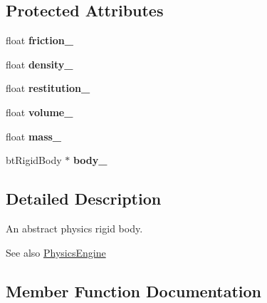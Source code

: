 \subsection*{Protected Attributes}
\begin{DoxyCompactItemize}
\item 
\mbox{\label{classTarbora_1_1RigidBody_a2ce3f561d2aeaab0e2efc613675c670f}} 
float {\bfseries friction\+\_\+}
\item 
\mbox{\label{classTarbora_1_1RigidBody_a9835a8aa577d42210e3eef8c54733d3e}} 
float {\bfseries density\+\_\+}
\item 
\mbox{\label{classTarbora_1_1RigidBody_a3e5ff1ecb93eca1a459188d07f4b40e4}} 
float {\bfseries restitution\+\_\+}
\item 
\mbox{\label{classTarbora_1_1RigidBody_a545c30e0443c98139522be2c7ce8caf8}} 
float {\bfseries volume\+\_\+}
\item 
\mbox{\label{classTarbora_1_1RigidBody_aab7639b1d7546bff208728a2d494e359}} 
float {\bfseries mass\+\_\+}
\item 
\mbox{\label{classTarbora_1_1RigidBody_a29c0718af663f9a80d4111e1050658c3}} 
bt\+Rigid\+Body $\ast$ {\bfseries body\+\_\+}
\end{DoxyCompactItemize}


\subsection{Detailed Description}
An abstract physics rigid body. 

\begin{DoxySeeAlso}{See also}
\hyperlink{classTarbora_1_1PhysicsEngine}{Physics\+Engine} 
\end{DoxySeeAlso}


\subsection{Member Function Documentation}
\mbox{\label{classTarbora_1_1RigidBody_afb1e923b3c9d499af761f51405b6bce2}} 
